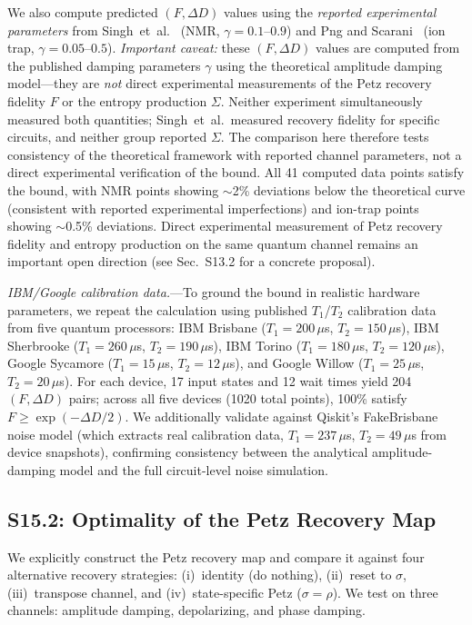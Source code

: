 \documentclass[prl,twocolumn,superscriptaddress,longbibliography]{revtex4-2}
\begin{document}
We also compute predicted $(F, \Delta D)$ values using the
\emph{reported experimental parameters} from Singh~et~al.~\cite{Singh2025}
(NMR, $\gamma = 0.1$--$0.9$) and Png and Scarani~\cite{Png2025}
(ion trap, $\gamma = 0.05$--$0.5$).
\emph{Important caveat:} these $(F, \Delta D)$ values are computed
from the published damping parameters $\gamma$ using the theoretical
amplitude damping model---they are \emph{not} direct experimental
measurements of the Petz recovery fidelity $F$ or the entropy
production $\Sigma$. Neither experiment simultaneously measured both
quantities; Singh~et~al.\ measured recovery fidelity for specific
circuits, and neither group reported $\Sigma$. The comparison here
therefore tests consistency of the theoretical framework with
reported channel parameters, not a direct experimental verification
of the bound.
All 41 computed data points satisfy the bound, with NMR
points showing $\sim$2\% deviations below the theoretical curve
(consistent with reported experimental imperfections) and ion-trap
points showing $\sim$0.5\% deviations. Direct experimental
measurement of Petz recovery fidelity and entropy production on
the same quantum channel remains an important open direction
(see Sec.~S13.2 for a concrete proposal).

\emph{IBM/Google calibration data.}---To ground the bound in
realistic hardware parameters, we repeat the calculation using
published $T_1$/$T_2$ calibration data from five quantum processors:
IBM Brisbane ($T_1 = 200\,\mu$s, $T_2 = 150\,\mu$s),
IBM Sherbrooke ($T_1 = 260\,\mu$s, $T_2 = 190\,\mu$s),
IBM Torino ($T_1 = 180\,\mu$s, $T_2 = 120\,\mu$s),
Google Sycamore ($T_1 = 15\,\mu$s, $T_2 = 12\,\mu$s), and
Google Willow ($T_1 = 25\,\mu$s, $T_2 = 20\,\mu$s).
For each device, 17 input states and 12 wait times yield
204 $(F, \Delta D)$ pairs; across all five devices (1020 total
points), 100\% satisfy $F \geq \exp(-\Delta D/2)$.
We additionally validate against Qiskit's FakeBrisbane
noise model (which extracts real calibration data, $T_1 = 237\,\mu$s,
$T_2 = 49\,\mu$s from device snapshots), confirming consistency
between the analytical amplitude-damping model and the full
circuit-level noise simulation.

\subsection{S15.2: Optimality of the Petz Recovery Map}

We explicitly construct the Petz recovery map and compare it against
four alternative recovery strategies: (i)~identity (do nothing),
(ii)~reset to $\sigma$, (iii)~transpose channel, and
(iv)~state-specific Petz ($\sigma = \rho$). We test on three
channels: amplitude damping, depolarizing, and phase damping.
\end{document}
